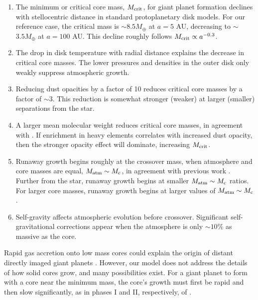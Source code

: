 \documentclass[apj, numberedappendix]{emulateapj}
\newcommand{\co}{_{\rm c}}
\newcommand{\MC}{M_{\rm crit}}
\begin{document}
\begin{enumerate}
\item The minimum or critical core mass, $\MC$, for giant planet formation declines with stellocentric distance in standard protoplanetary disk models.  For our reference case, the critical mass is $\sim$$8.5 M_{\oplus}$ at $a = 5$ AU, decreasing to $\sim$$3.5 M_{\oplus}$ at $a =100$ AU.  This decline roughly follows $\MC \propto a^{-0.3}$.

\item The drop in disk temperature with radial distance explains the decrease in critical core masses.  The lower pressures and densities in the outer disk only weakly suppress atmospheric growth.

\item Reducing dust opacities by a factor of 10 reduces critical core masses by a factor of $\sim$$3$.  This reduction is somewhat stronger (weaker) at larger (smaller) separations from the star.

\item A larger mean molecular weight reduces critical core masses, in agreement with \citet{HorIko11}.  If enrichment in heavy elements correlates with increased dust opacity, then the stronger opacity effect will dominate, increasing $\MC$.

\item Runaway growth begins roughly at the crossover mass, when atmosphere and core masses are equal, $M_{\rm atm} \sim M\co$, in agreement with previous work \citep{pollack96}.  Further from the star, runaway growth begins at smaller $M_{\rm atm} \sim M\co$ ratios.  For larger core masses, runaway growth begins at larger values of $M_{\rm atm} \sim M\co$.

\item Self-gravity affects atmospheric evolution before crossover.  Significant self-gravitational corrections appear when the atmosphere is only $\sim$$10 \%$ as massive as the core.

\end{enumerate}

Rapid gas accretion onto low mass cores could explain the origin of distant directly imaged giant planets \citep{marois08, lagrange10}.  However, our model does not address the details of how solid cores grow, and many possibilities exist.  For a giant planet to form with a core near the minimum mass, the core's growth must  first be rapid and then slow significantly, as in phases I and II, respectively, of \cite{pollack96}.   
\end{document}
